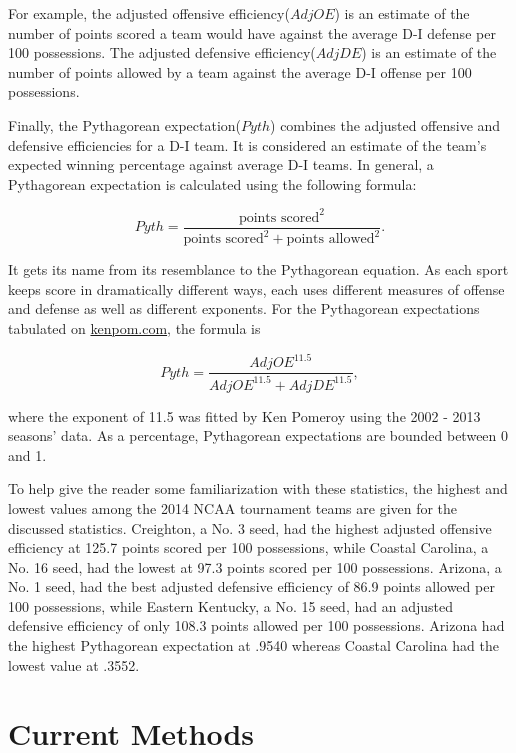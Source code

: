 \documentclass[5p, preprint]{elsarticle}
\begin{document}
For example, the adjusted offensive efficiency($AdjOE$) is an estimate of the number of points scored a team would have against the average D-I defense per 100 possessions. The adjusted defensive efficiency($AdjDE$) is an estimate of the number of points allowed by a team against the average D-I offense per 100 possessions. 

Finally, the Pythagorean expectation($Pyth$) combines the adjusted offensive and defensive efficiencies for a D-I team. It is considered an estimate of the team's expected winning percentage against average D-I teams. In general, a Pythagorean expectation is calculated using the following formula:

\[
Pyth = \frac{\mbox{points scored} ^ 2}{\mbox{points scored} ^ 2 + \mbox{points allowed} ^ 2}.
\]

It gets its name from its resemblance to the Pythagorean equation. As each sport keeps score in dramatically different ways, each uses different measures of offense and defense as well as different exponents. For the Pythagorean expectations tabulated on \href{kenpom.com}{kenpom.com}, the formula is

\[
Pyth = \frac{AdjOE^{11.5}}{AdjOE^{11.5} + AdjDE^{11.5}},
\]

where the exponent of 11.5 was fitted by Ken Pomeroy using the 2002 - 2013 seasons' data. As a percentage, Pythagorean expectations are bounded between 0 and 1. 

To help give the reader some familiarization with these statistics, the highest and lowest values among the 2014 NCAA tournament teams are given for the discussed statistics. Creighton, a No. 3 seed, had the highest adjusted offensive efficiency at 125.7 points scored per 100 possessions, while Coastal Carolina, a No. 16 seed, had the lowest at 97.3 points scored per 100 possessions. Arizona, a No. 1 seed, had the best adjusted defensive efficiency of 86.9 points allowed per 100 possessions, while Eastern Kentucky, a No. 15 seed, had an adjusted defensive efficiency of only 108.3 points allowed per 100 possessions. Arizona had the highest Pythagorean expectation at .9540 whereas Coastal Carolina had the lowest value at .3552.

\vspace*{-.1in}

\section{Current Methods}

\vspace*{-.1in}
\end{document}
